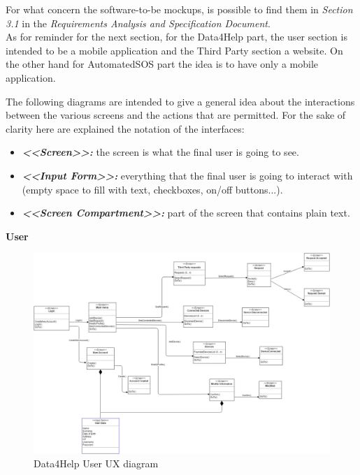 \begin{flushleft}
{}

For what concern the software-to-be mockups, is possible to find them in \textit{Section 3.1} in the \textit{Requirements Analysis and Specification Document}.\\
As for reminder for the next section, for the Data4Help part, the user section is intended to be a mobile application and the Third Party section a website. On the other hand for AutomatedSOS part the idea is to have only a mobile application.
{}

The following diagrams are intended to give a general idea about the interactions between the various screens and the actions that are permitted.
For the sake of clarity here are explained the notation of the interfaces:
\begin{itemize}
\item \textbf{\textit{<<Screen>>:}} the screen is what the final user is going to see.
\item \textbf{\textit{<<Input Form>>:}} everything that the final user is going to interact with (empty space to fill with text, checkboxes, on/off buttons...).
\item \textbf{\textit{<<Screen Compartment>>:}} part of the screen that contains plain text.
\end{itemize}

{}

\textbf{User}

\begin{figure}[H]
	\centering
	\includegraphics[scale=0.3]{Images/User_interface/Trackme-Data4Helpuser}
	\caption{Data4Help User UX diagram}
\end{figure}
	

\end{flushleft}
